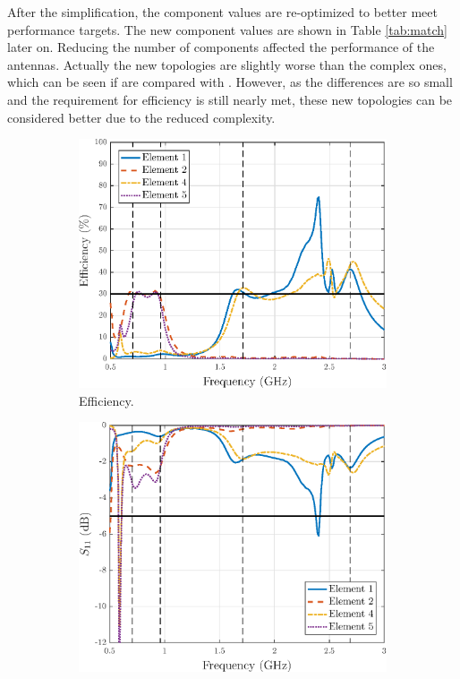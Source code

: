 After the simplification, the component values are re-optimized to better meet performance targets. The new component values are shown in Table \ref{tab:match} later on. Reducing the number of components affected the performance of the antennas. Actually the new topologies are slightly worse than the complex ones, which can be seen if  are compared with . However, as the differences are so small and the requirement for efficiency is still nearly met, these new topologies can be considered better due to the reduced complexity.
\begin{figure}[H]
    \centering
    \begin{subfigure}[b]{0.49\textwidth}
        \includegraphics[width=\textwidth]{img/diversity_eff_ideal.eps}
        \caption{Efficiency.}
        \label{fig:div_eff_ideal}
    \end{subfigure}
    \begin{subfigure}[b]{0.49\textwidth}
        \includegraphics[width=\textwidth]{img/diversity_final_match.eps}

\end{subfigure}
\end{figure}
